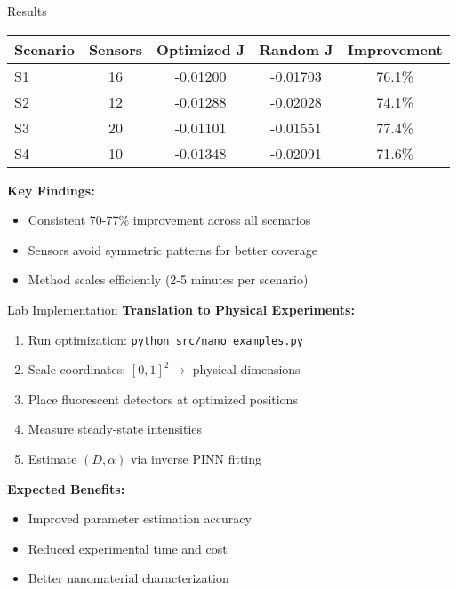 \documentclass[aspectratio=169]{beamer}
\begin{document}
\begin{frame}{Results}
\begin{table}
\centering
\begin{tabular}{@{}lcccc@{}}
\toprule
\textbf{Scenario} & \textbf{Sensors} & \textbf{Optimized J} & \textbf{Random J} & \textbf{Improvement} \\
\midrule
S1 & 16 & -0.01200 & -0.01703 & 76.1\% \\
S2 & 12 & -0.01288 & -0.02028 & 74.1\% \\
S3 & 20 & -0.01101 & -0.01551 & 77.4\% \\
S4 & 10 & -0.01348 & -0.02091 & 71.6\% \\
\bottomrule
\end{tabular}
\end{table}

\vspace{0.3cm}
\textbf{Key Findings:}
\begin{itemize}
    \item Consistent 70-77\% improvement across all scenarios
    \item Sensors avoid symmetric patterns for better coverage
    \item Method scales efficiently (2-5 minutes per scenario)
\end{itemize}
\end{frame}

\begin{frame}{Lab Implementation}
\textbf{Translation to Physical Experiments:}
\begin{enumerate}
    \item Run optimization: \texttt{python src/nano\_examples.py}
    \item Scale coordinates: $[0,1]^2 \rightarrow$ physical dimensions
    \item Place fluorescent detectors at optimized positions
    \item Measure steady-state intensities
    \item Estimate $(D, \alpha)$ via inverse PINN fitting
\end{enumerate}

\vspace{0.3cm}
\textbf{Expected Benefits:}
\begin{itemize}
    \item Improved parameter estimation accuracy
    \item Reduced experimental time and cost
    \item Better nanomaterial characterization
\end{itemize}
\end{frame}
\end{document}
